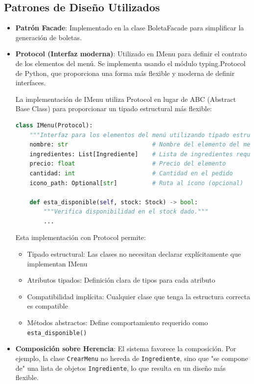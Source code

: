 \documentclass[12pt,letterpaper]{article}
\begin{document}
\subsection{Patrones de Diseño Utilizados}
\begin{itemize}
    \item \textbf{Patrón Facade}: Implementado en la clase BoletaFacade para simplificar la generación de boletas.
    \item \textbf{Protocol (Interfaz moderna)}: Utilizado en IMenu para definir el contrato de los elementos del menú. Se implementa usando el módulo typing.Protocol de Python, que proporciona una forma más flexible y moderna de definir interfaces.

La implementación de IMenu utiliza Protocol en lugar de ABC (Abstract Base Class) para proporcionar un tipado estructural más flexible:

\begin{lstlisting}[language=Python, caption=Interfaz IMenu usando Protocol]
class IMenu(Protocol):
    """Interfaz para los elementos del menú utilizando tipado estructural."""
    nombre: str                        # Nombre del elemento del menú
    ingredientes: List[Ingrediente]    # Lista de ingredientes requeridos
    precio: float                      # Precio del elemento
    cantidad: int                      # Cantidad en el pedido
    icono_path: Optional[str]          # Ruta al ícono (opcional)
    
    def esta_disponible(self, stock: Stock) -> bool:
        """Verifica disponibilidad en el stock dado."""
        ...
\end{lstlisting}

Esta implementación con Protocol permite:
\begin{itemize}
    \item Tipado estructural: Las clases no necesitan declarar explícitamente que implementan IMenu
    \item Atributos tipados: Definición clara de tipos para cada atributo
    \item Compatibilidad implícita: Cualquier clase que tenga la estructura correcta es compatible
    \item Métodos abstractos: Define comportamiento requerido como \texttt{esta\_disponible()}
\end{itemize}
        \item \textbf{Composición sobre Herencia}: El sistema favorece la composición. Por ejemplo, la clase \texttt{CrearMenu} no hereda de \texttt{Ingrediente}, sino que "se compone de" una lista de objetos \texttt{Ingrediente}, lo que resulta en un diseño más flexible.
    

\end{itemize}
\end{document}
